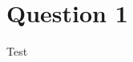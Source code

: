 \documentclass[11pt]{article}
\begin{document}
\section{Question 1}\label{sec:question-1}
Test
\end{document}
